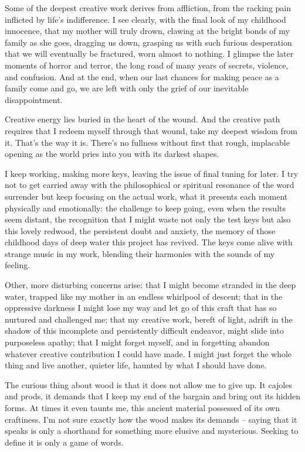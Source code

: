 \documentclass[letterpaper,10pt,headsepline]{scrreprt}
\begin{document}
Some of the deepest creative work derives from affliction, from the racking pain inflicted by life’s indifference. I see clearly, with the final look of my childhood innocence, that my mother will truly drown, clawing at the bright bonds of my family as she goes, dragging us down, grasping us with such furious desperation that we will eventually be fractured, worn almost to nothing. I glimpse the later moments of horror and terror, the long road of many years of secrets, violence, and confusion. And at the end, when our last chances for making peace as a family come and go, we are left with only the grief of our inevitable disappointment.

Creative energy lies buried in the heart of the wound. And the creative path requires that I redeem myself through that wound, take my deepest wisdom from it. That’s the way it is. There’s no fullness without first that rough, implacable opening as the world pries into you with its darkest shapes.

I keep working, making more keys, leaving the issue of final tuning for later. I try not to get carried away with the philosophical or spiritual resonance of the word surrender but keep focusing on the actual work, what it presents each moment physically and emotionally: the challenge to keep going, even when the results seem distant, the recognition that I might waste not only the test keys but also this lovely redwood, the persistent doubt and anxiety, the memory of those childhood days of deep water this project has revived. The keys come alive with strange music in my work, blending their harmonies with the sounds of my feeling.

Other, more disturbing concerns arise: that I might become stranded in the deep water, trapped like my mother in an endless whirlpool of descent; that in the oppressive darkness I might lose my way and let go of this craft that has so nurtured and challenged me; that my creative work, bereft of light, adrift in the shadow of this incomplete and persistently difficult endeavor, might slide into purposeless apathy; that I might forget myself, and in forgetting abandon whatever creative contribution I could have made. I might just forget the whole thing and live another, quieter life, haunted by what I should have done.

The curious thing about wood is that it does not allow me to give up. It cajoles and prods, it demands that I keep my end of the bargain and bring out its hidden forms. At times it even taunts me, this ancient material possessed of its own craftiness. I’m not sure exactly how the wood makes its demands – saying that it speaks is only a shorthand for something more elusive and mysterious. Seeking to define it is only a game of words.
\end{document}
